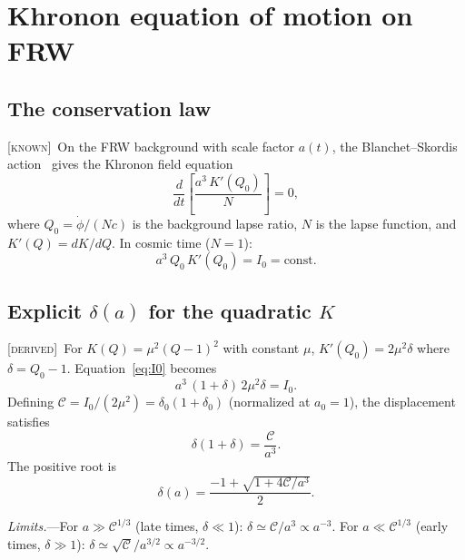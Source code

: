 \documentclass[prd,twocolumn,superscriptaddress,longbibliography,floatfix]{revtex4-2}
\newcommand{\known}{\textsc{[known]}}
\newcommand{\derived}{\textsc{[derived]}}
\begin{document}
\section{Khronon equation of motion on FRW}
\label{sec:EOM}

\subsection{The conservation law}
\label{sec:conservation}

\known\ On the FRW background with scale factor $a(t)$,
the Blanchet--Skordis action~\cite{BS2024} gives the
Khronon field equation
\begin{equation}
\frac{d}{dt}\!\left[\frac{a^3\,K'(Q_0)}{N}\right] = 0,
\label{eq:conservation}
\end{equation}
where $Q_0 = \dot{\phi}/(Nc)$ is the background lapse
ratio, $N$ is the lapse function, and
$K'(Q) = dK/dQ$.  In cosmic time ($N = 1$):
\begin{equation}
a^3\,Q_0\,K'(Q_0) = I_0 = \mathrm{const}.
\label{eq:I0}
\end{equation}

\subsection{Explicit $\delta(a)$ for the quadratic $K$}
\label{sec:delta_quad}

\derived\ For $K(Q) = \mu^2(Q{-}1)^2$ with constant
$\mu$, $K'(Q_0) = 2\mu^2\delta$ where $\delta = Q_0 - 1$.
Equation~\eqref{eq:I0} becomes
\begin{equation}
a^3\,(1{+}\delta)\,2\mu^2\delta = I_0.
\label{eq:conservation_quad}
\end{equation}
Defining $\mathcal{C} = I_0/(2\mu^2) = \delta_0(1{+}\delta_0)$
(normalized at $a_0 = 1$), the displacement satisfies
\begin{equation}
\boxed{\delta(1{+}\delta) = \frac{\mathcal{C}}{a^3}.}
\label{eq:delta_implicit}
\end{equation}
The positive root is
\begin{equation}
\delta(a) = \frac{-1 + \sqrt{1 + 4\mathcal{C}/a^3}}{2}.
\label{eq:delta_explicit}
\end{equation}

\emph{Limits.}---For $a \gg \mathcal{C}^{1/3}$ (late
times, $\delta \ll 1$):
$\delta \simeq \mathcal{C}/a^3 \propto a^{-3}$.
For $a \ll \mathcal{C}^{1/3}$ (early times, $\delta \gg 1$):
$\delta \simeq \sqrt{\mathcal{C}}/a^{3/2} \propto a^{-3/2}$.
\end{document}
